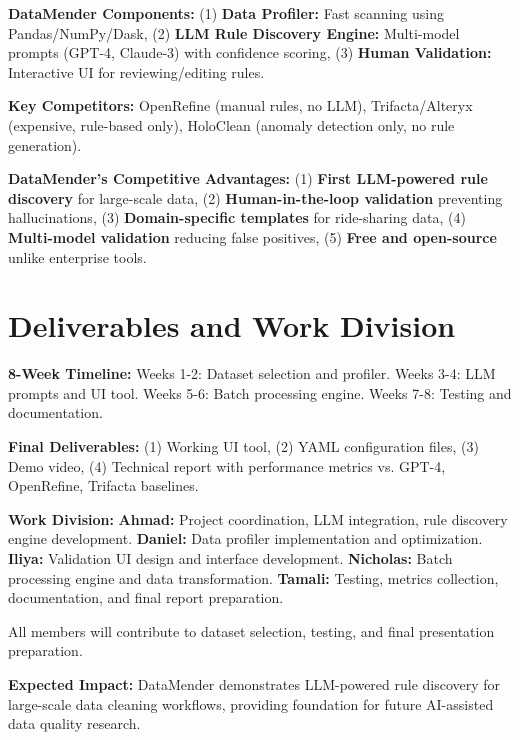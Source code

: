 \documentclass[11pt]{article}
\begin{document}
\textbf{DataMender Components:} (1) \textbf{Data Profiler:} Fast scanning using Pandas/NumPy/Dask, (2) \textbf{LLM Rule Discovery Engine:} Multi-model prompts (GPT-4, Claude-3) with confidence scoring, (3) \textbf{Human Validation:} Interactive UI for reviewing/editing rules.

\textbf{Key Competitors:} OpenRefine (manual rules, no LLM), Trifacta/Alteryx (expensive, rule-based only), HoloClean (anomaly detection only, no rule generation).

\textbf{DataMender's Competitive Advantages:} (1) \textbf{First LLM-powered rule discovery} for large-scale data, (2) \textbf{Human-in-the-loop validation} preventing hallucinations, (3) \textbf{Domain-specific templates} for ride-sharing data, (4) \textbf{Multi-model validation} reducing false positives, (5) \textbf{Free and open-source} unlike enterprise tools.


\section{\color{primaryblue}Deliverables and Work Division}

\textbf{8-Week Timeline:} Weeks 1-2: Dataset selection and profiler. Weeks 3-4: LLM prompts and UI tool. Weeks 5-6: Batch processing engine. Weeks 7-8: Testing and documentation.

\textbf{Final Deliverables:} (1) Working UI tool, (2) YAML configuration files, (3) Demo video, (4) Technical report with performance metrics vs. GPT-4, OpenRefine, Trifacta baselines.

\textbf{Work Division:} \textbf{Ahmad:} Project coordination, LLM integration, rule discovery engine development. \textbf{Daniel:} Data profiler implementation and optimization. \textbf{Iliya:} Validation UI design and interface development. \textbf{Nicholas:} Batch processing engine and data transformation. \textbf{Tamali:} Testing, metrics collection, documentation, and final report preparation.

All members will contribute to dataset selection, testing, and final presentation preparation.

\textbf{Expected Impact:} DataMender demonstrates LLM-powered rule discovery for large-scale data cleaning workflows, providing foundation for future AI-assisted data quality research.
\end{document}
